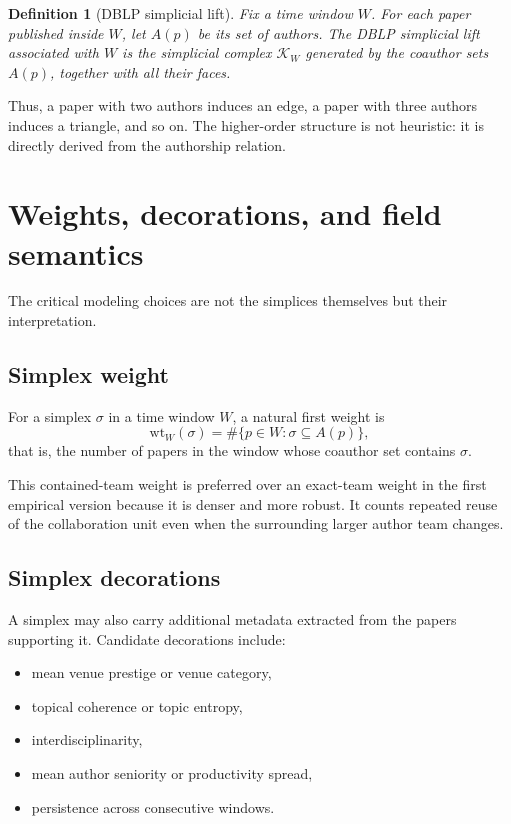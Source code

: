 \documentclass[11pt]{article}
\newtheorem{definition}{Definition}[section]
\newcommand{\K}{\mathcal{K}}
\newcommand{\wt}{\mathrm{wt}}
\begin{document}
\begin{definition}[DBLP simplicial lift]
Fix a time window $W$. For each paper published inside $W$, let $A(p)$ be its set of authors. The DBLP simplicial lift associated with $W$ is the simplicial complex $\K_W$ generated by the coauthor sets $A(p)$, together with all their faces.
\end{definition}

Thus, a paper with two authors induces an edge, a paper with three authors induces a triangle, and so on. The higher-order structure is not heuristic: it is directly derived from the authorship relation.

\section{Weights, decorations, and field semantics}
The critical modeling choices are not the simplices themselves but their interpretation.

\subsection*{Simplex weight}
For a simplex $\sigma$ in a time window $W$, a natural first weight is
\[
\wt_W(\sigma)=\#\{p\in W: \sigma \subseteq A(p)\},
\]
that is, the number of papers in the window whose coauthor set contains $\sigma$.

This contained-team weight is preferred over an exact-team weight in the first empirical version because it is denser and more robust. It counts repeated reuse of the collaboration unit even when the surrounding larger author team changes.

\subsection*{Simplex decorations}
A simplex may also carry additional metadata extracted from the papers supporting it. Candidate decorations include:
\begin{itemize}
    \item mean venue prestige or venue category,
    \item topical coherence or topic entropy,
    \item interdisciplinarity,
    \item mean author seniority or productivity spread,
    \item persistence across consecutive windows.
\end{itemize}
\end{document}
